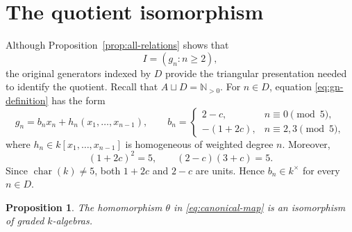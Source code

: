 \documentclass[11pt,reqno]{amsart}
\newtheorem{proposition}[theorem]{Proposition}
\theoremstyle{definition}
\theoremstyle{remark}
\theoremstyle{plain}
\newcommand{\NN}{\mathbb N}
\newcommand{\modulo}[1]{\pmod {#1}}
\begin{document}




\section{The quotient isomorphism}\label{sec:quotient}

Although Proposition~\ref{prop:all-relations} shows that
\[
 I=(g_n:n\geq2),
\]
the original generators indexed by \(D\) provide the triangular
presentation needed to identify the quotient.  Recall that
\(A\sqcup D=\NN_{>0}\).  For \(n\in D\), equation
\eqref{eq:gn-definition} has the form
\begin{equation}\label{eq:triangular-relation}
 g_n=b_nx_n+h_n(x_1,\ldots,x_{n-1}),\qquad
 b_n=
 \begin{cases}
   2-c,&n\equiv0\modulo5,\\
   -(1+2c),&n\equiv2,3\modulo5,
 \end{cases}
\end{equation}
where \(h_n\in k[x_1,\ldots,x_{n-1}]\) is homogeneous of weighted
degree \(n\).  Moreover,
\[
 (1+2c)^2=5,\qquad (2-c)(3+c)=5.
\]
Since \(\operatorname{char}(k)\neq5\), both \(1+2c\) and \(2-c\) are
units.  Hence \(b_n\in k^\times\) for every \(n\in D\).

\begin{proposition}\label{prop:quotient-isomorphism}
The homomorphism \(\theta\) in \eqref{eq:canonical-map} is an
isomorphism of graded \(k\)-algebras.
\end{proposition}
\end{document}
